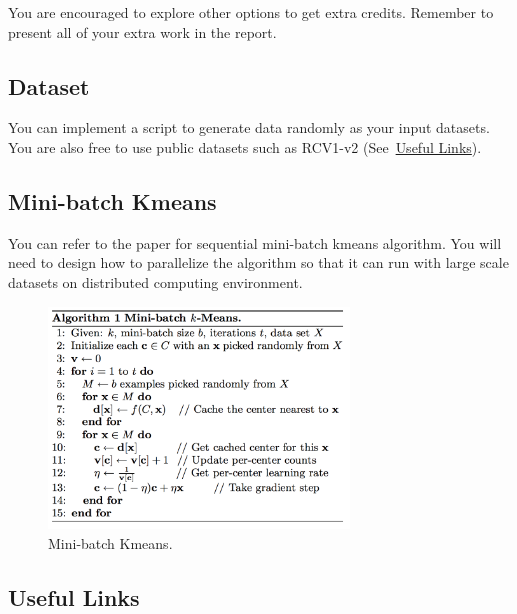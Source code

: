 You are encouraged to explore other options to get extra
credits. Remember to present all of your extra work in the report.
 
\subsection*{Dataset}

You can implement a script to generate data randomly as your input
datasets.  You are also free to use public datasets such as RCV1-v2
(See~\hyperlink{link_project8}{Useful Links}).
  
\subsection*{Mini-batch Kmeans}

You can refer to the paper for sequential mini-batch kmeans
algorithm. You will need to design how to parallelize the algorithm so
that it can run with large scale datasets on distributed computing
environment.

\begin{figure}[htb]
\includegraphics[width=8cm]{section/icloud/assignment/problems/project8/mbkmeans}
\centering
\caption{Mini-batch Kmeans.}
\end{figure}  

\subsection*{Useful Links}

